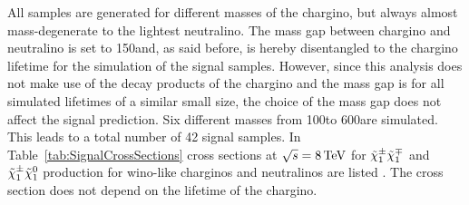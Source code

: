 All samples are generated for different masses of the chargino, but always almost mass-degenerate to the lightest neutralino.
The mass gap between chargino and neutralino is set to 150\mev and, as said before, is hereby disentangled to the chargino lifetime for the simulation of the signal samples.
However, since this analysis does not make use of the decay products of the chargino and the mass gap is for all simulated lifetimes of a similar small size, the choice of the mass gap does not affect the signal prediction.
Six different masses from 100\gev to 600\gev are simulated.
This leads to a total number of 42 signal samples.
In Table~\ref{tab:SignalCrossSections} cross sections at $\sqrt{s}=8\,\text{Te}\kern-0.06667em\text{V}$ for $\tilde{\chi}^{\pm}_{1}\tilde{\chi}^{\mp}_{1}$ and $\tilde{\chi}^{\pm}_{1}\tilde{\chi}^{0}_{1}$ production 
for wino-like charginos and neutralinos are listed \cite{bib:SignalCrossSection_2012,bib:SignalCrossSection_2013}.
The cross section does not depend on the lifetime of the chargino.
\renewcommand{\arraystretch}{1.5}
\begin{table}[h]
\centering
\caption{Simulated signal mass points with corresponding cross sections at NLO-NLL (NLO: next-to-leading order, NLL: next-to-leading logarithmic) accuracy for wino-like charginos.}
\label{tab:SignalCrossSections}
\end{table}  

